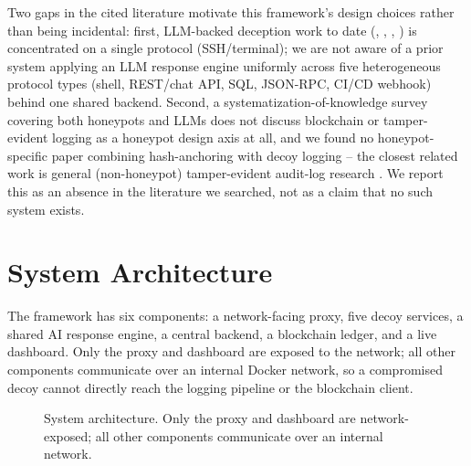 \documentclass[conference]{IEEEtran}
\begin{document}
Two gaps in the cited literature motivate this framework's design choices
rather than being incidental: first, LLM-backed deception work to date
(\cite{sladic2024shellm}, \cite{wang2024honeygpt}, \cite{mckee2023chatbots},
\cite{llmhoneypot2024}) is concentrated on a single protocol (SSH/terminal);
we are not aware of a prior system applying an LLM response engine uniformly
across five heterogeneous protocol types (shell, REST/chat API, SQL,
JSON-RPC, CI/CD webhook) behind one shared backend. Second, a
systematization-of-knowledge survey covering both honeypots and LLMs
\cite{sokhoneypotllm2025} does not discuss blockchain or tamper-evident
logging as a honeypot design axis at all, and we found no honeypot-specific
paper combining hash-anchoring with decoy logging -- the closest related
work is general (non-honeypot) tamper-evident audit-log research
\cite{blockchainevidence2025,cloudvmforensics2022,peerjthreat2025}. We
report this as an absence in the literature we searched, not as a claim that
no such system exists.

\section{System Architecture}

The framework has six components: a network-facing proxy, five decoy
services, a shared AI response engine, a central backend, a blockchain
ledger, and a live dashboard. Only the proxy and dashboard are exposed to the
network; all other components communicate over an internal Docker network,
so a compromised decoy cannot directly reach the logging pipeline or the
blockchain client.

\begin{figure}[htbp]
\centering
{}
\caption{System architecture. Only the proxy and dashboard are
network-exposed; all other components communicate over an internal network.}
\label{fig:architecture}
\end{figure}
\end{document}
